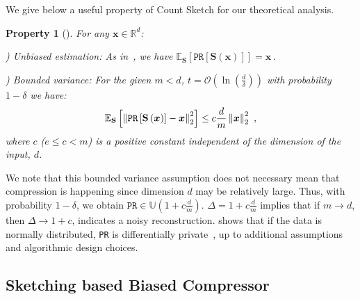 \documentclass[sigconf, anonymous, review]{acmart}
\newtheorem{property}{Property}
\begin{document}
We give below a useful property of Count Sketch for our theoretical analysis.
\begin{property}[\citep{li2019privacy}]\label{prop:1}
For any $\boldsymbol{x}\in \mathbb{R}^{d}$:

) \textit{Unbiased estimation}: As in~\cite{li2019privacy}, we have $ \mathbb{E}_{\mathbf{S}}\left[\texttt{PR}\left[\mathbf{S}\left(\boldsymbol{x}\right)\right]\right]=\boldsymbol{x}\, $.

) \textit{Bounded variance:} For the given $m<d$, $t=\mathcal{O}\left(\ln \left(\frac{d}{\delta}\right)\right)$ with probability $1-\delta$ we have:
    \begin{align}\notag
        \mathbb{E}_{\mathbf{S}}\left[\left\|\texttt{PR}\left[\mathbf{S}\left(\boldsymbol{x}\right)\right]-\boldsymbol{x}\right\|_2^2\right] \leq c\frac{d}{m}\left\|\boldsymbol{x}\right\|_2^2\ , 
    \end{align}
 where $c$ ($e\leq c<m$) is a positive constant independent of the dimension of the input, $d$.
\end{property}
 We note that this bounded variance assumption does not necessary mean that compression is happening since dimension $d$ may be relatively large. 
Thus, with probability $1-\delta$, we obtain $\texttt{PR}\in \mathbb{U}(1+c\frac{d}{m})$.
 $\Delta=1+c\frac{d}{m}$ implies that if $m\rightarrow d$, then $\Delta\rightarrow 1+c$, indicates a noisy reconstruction. 
 \citep{li2019privacy} shows that if the data is normally distributed, \texttt{PR} is differentially private~\citep{DBLP:conf/icalp/Dwork06}, up to additional assumptions and algorithmic design choices.


\subsection{Sketching based Biased Compressor}
\end{document}
